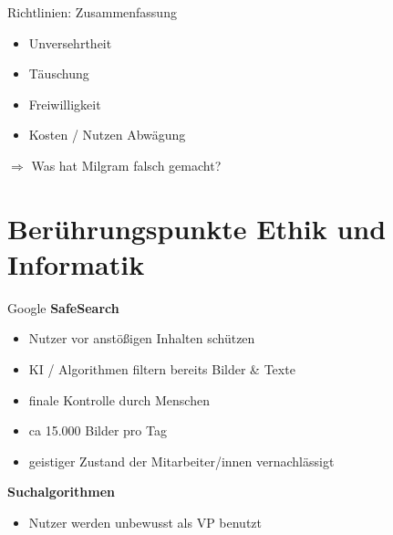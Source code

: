 \documentclass[10pt]{beamer}
\begin{document}
	\begin{frame}{Richtlinien: Zusammenfassung}
			\begin{itemize}
				\item Unversehrtheit
				\item Täuschung
				\item Freiwilligkeit
				\item Kosten / Nutzen Abwägung
			\end{itemize}
			\vspace{1cm}
			$\Rightarrow$ Was hat Milgram falsch gemacht?
	\end{frame}

\section{Berührungspunkte Ethik und Informatik}
	
	\begin{frame}{Google}
		\textbf{SafeSearch}
		\begin{itemize}
			\item Nutzer vor anstößigen Inhalten schützen
			\item KI / Algorithmen filtern bereits Bilder \& Texte
			\item finale Kontrolle durch Menschen
			\item ca 15.000 Bilder pro Tag
			\item geistiger Zustand der Mitarbeiter/innen vernachlässigt
		\end{itemize}
		\textbf{Suchalgorithmen}
		\begin{itemize}
			\item Nutzer werden unbewusst als VP benutzt
		\end{itemize}
	\end{frame}
	
\end{document}
